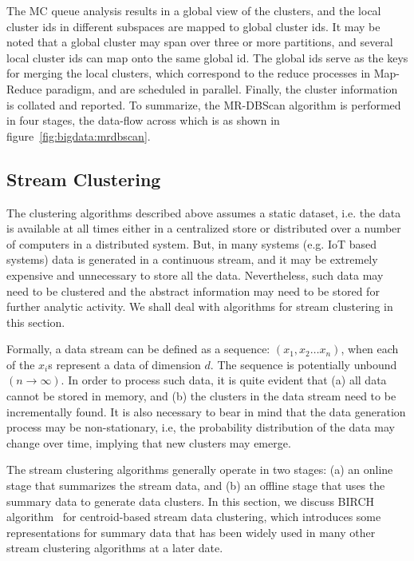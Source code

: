 \noindent
The MC queue analysis results in a global view of the clusters, and the local cluster ids in different subspaces are mapped to global
cluster ids. It may be noted that a global cluster may span over three or more partitions, and several local cluster ids can map onto
the same global id. The global ids serve as the keys for merging the local clusters, which correspond to the reduce processes 
in Map-Reduce paradigm, and are scheduled in parallel. Finally, the cluster information is collated and reported. 
%
To summarize, the MR-DBScan algorithm is performed in four stages, the data-flow across which is as shown in 
figure~\ref{fig:bigdata:mrdbscan}.

\subsection{Stream Clustering}
\label{sec:bigdata:stream}

The clustering algorithms described above assumes a static dataset, i.e. the data is available at all times either in a centralized 
store or distributed over a number of computers in a distributed system. But, in many systems (e.g. IoT based systems) data is 
generated in a continuous stream, and it may be extremely expensive and unnecessary to store all the data. Nevertheless, such data
may need to be clustered and the abstract information may need to be stored for further analytic activity. We shall deal with
algorithms for stream clustering in this section.

Formally, a data stream can be defined as a sequence: $\left(x_1, x_2 \dots x_n\right)$, when each of the $x_i$s 
represent a data of dimension $d$. The sequence is potentially unbound $(n \rightarrow \infty)$. In order to process such data,
it is quite evident that (a) all data cannot be stored in memory, and (b) the clusters in the data stream need to be incrementally
found. It is also necessary to bear in mind that the data generation process may be non-stationary, i.e, the probability distribution 
of the data may change over time, implying that new clusters may emerge. 

The stream clustering algorithms generally operate in two stages: (a) an online stage that summarizes the stream data, and (b) an 
offline stage that uses the summary data to generate data clusters. In this section, we discuss BIRCH algorithm~\citep{Zhang:1997} 
for centroid-based stream data clustering, which introduces some representations for summary data that has been widely used in many 
other stream clustering algorithms at a later date.

